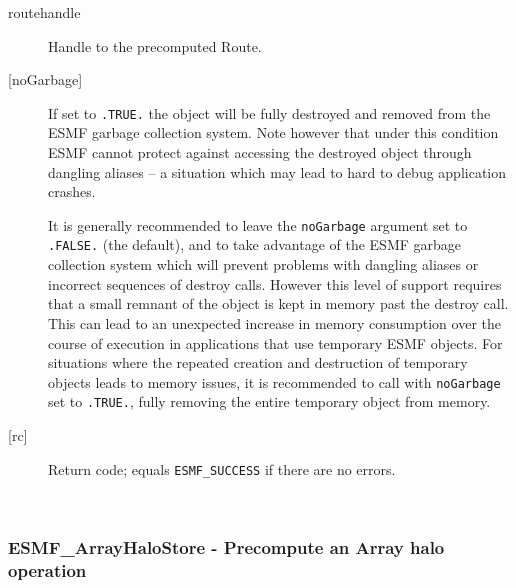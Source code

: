      \begin{description}
     \item [routehandle]
       Handle to the precomputed Route.
     \item[{[noGarbage]}]
       If set to {\tt .TRUE.} the object will be fully destroyed and removed
       from the ESMF garbage collection system. Note however that under this 
       condition ESMF cannot protect against accessing the destroyed object 
       through dangling aliases -- a situation which may lead to hard to debug 
       application crashes.
   
       It is generally recommended to leave the {\tt noGarbage} argument
       set to {\tt .FALSE.} (the default), and to take advantage of the ESMF 
       garbage collection system which will prevent problems with dangling
       aliases or incorrect sequences of destroy calls. However this level of
       support requires that a small remnant of the object is kept in memory
       past the destroy call. This can lead to an unexpected increase in memory
       consumption over the course of execution in applications that use 
       temporary ESMF objects. For situations where the repeated creation and 
       destruction of temporary objects leads to memory issues, it is 
       recommended to call with {\tt noGarbage} set to {\tt .TRUE.}, fully 
       removing the entire temporary object from memory.
     \item [{[rc]}]
       Return code; equals {\tt ESMF\_SUCCESS} if there are no errors.
     \end{description}
   
 
\mbox{}\hrulefill\ 
 
\subsubsection [ESMF\_ArrayHaloStore] {ESMF\_ArrayHaloStore - Precompute an Array halo operation}


